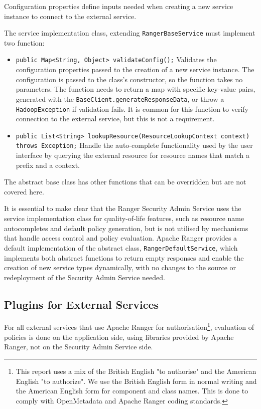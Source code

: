 Configuration properties define inputs needed when creating a new service instance to connect to the external service.

The service implementation class, extending \texttt{RangerBaseService} must implement two function:

\begin{itemize}
    \item \texttt{public Map<String, Object> validateConfig();} Validates the configuration properties passed to the creation of a new service instance. The configuration is passed to the class's constructor, so the function takes no parameters. The function needs to return a map with specific key-value pairs, generated with the \texttt{BaseClient.generateResponseData}, or throw a \texttt{HadoopException} if validation fails. It is common for this function to verify connection to the external service, but this is not a requirement.
    \item \texttt{public List<String> lookupResource(ResourceLookupContext context) throws Exception;} Handle the auto-complete functionality used by the user interface by querying the external resource for resource names that match a prefix and a context.  
\end{itemize}

The abstract base class has other functions that can be overridden but are not covered here. 

It is essential to make clear that the Ranger Security Admin Service uses the service implementation class for quality-of-life features, such as resource name autocompletes and default policy generation, but is not utilised by mechanisms that handle access control and policy evaluation. Apache Ranger provides a default implementation of the abstract class, \texttt{RangerDefaultService}, which implements both abstract functions to return empty responses and enable the creation of new service types dynamically, with no changes to the source or redeployment of the Security Admin Service needed.

\subsection{Plugins for External Services}

For all external services that use Apache Ranger for authorisation\footnote{This report uses a mix of the British English "to authorise" and the American English "to authorize". We use the British English form in normal writing and the American English form for component and class names. This is done to comply with OpenMetadata and Apache Ranger coding standards.}, evaluation of policies is done on the application side, using libraries provided by Apache Ranger, not on the Security Admin Service side.

